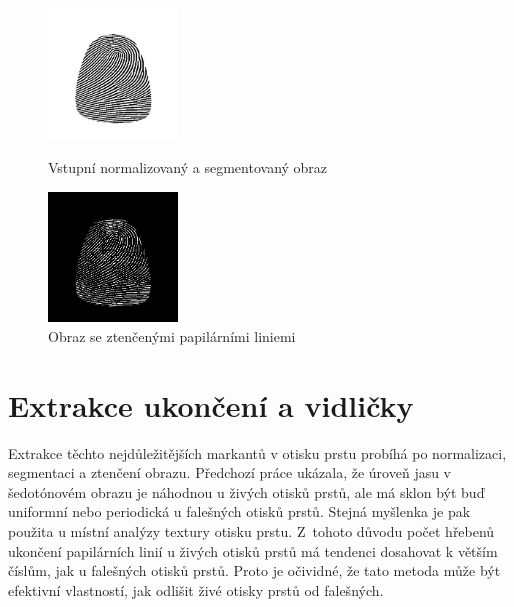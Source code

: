 \begin{figure}[htbp]
  \begin{minipage}[b]{0.5\linewidth}
    \centering
    \includegraphics[width=130]{obrazky-figures/SG_LLnorm.png}
    \caption{Vstupní normalizovaný a segmentovaný obraz}
    \label{fig:origimg}
  \end{minipage}
  \hspace{0.5cm}
  \begin{minipage}[b]{0.5\linewidth}
    \centering
    \includegraphics[width=130]{obrazky-figures/SG_LLthin.png}
    \caption{Obraz se ztenčenými papilárními liniemi}
    \label{fig:normimg}
  \end{minipage}
\end{figure}
\section{Extrakce ukončení a vidličky}
Extrakce těchto nejdůležitějších markantů v otisku prstu probíhá po normalizaci, segmentaci a ztenčení obrazu. Předchozí práce ukázala, že úroveň jasu v šedotónovém obrazu je náhodnou u živých otisků prstů, ale má sklon být buď uniformní nebo periodická u falešných otisků prstů. Stejná myšlenka je pak použita u místní analýzy textury otisku prstu. Z~tohoto důvodu počet hřebenů ukončení papilárních linií u živých otisků prstů má tendenci dosahovat k větším číslům, jak u falešných otisků prstů. Proto je očividné, že tato metoda může být efektivní vlastností, jak odlišit živé otisky prstů od falešných.\cite{AbhiskekStudy}

